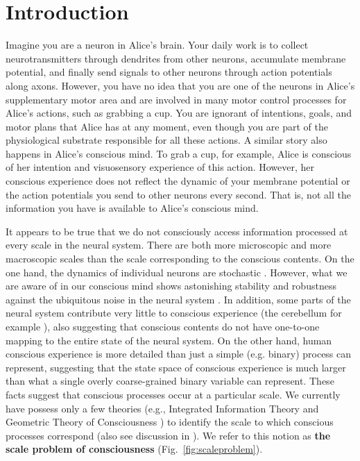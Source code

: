 \documentclass[utf8]{article}
\begin{document}
    \newpage
	\section{Introduction}

		Imagine you are a neuron in Alice’s brain. Your daily work is to collect neurotransmitters through dendrites from other neurons, accumulate membrane potential, and finally send signals to other neurons through action potentials along axons. However, you have no idea that you are one of the neurons in Alice’s supplementary motor area and are involved in many motor control processes for Alice’s actions, such as grabbing a cup. You are ignorant of intentions, goals, and motor plans that Alice has at any moment, even though you are part of the physiological substrate responsible for all these actions. A similar story also happens in Alice’s conscious mind. To grab a cup, for example, Alice is conscious of her intention and visuosensory experience of this action. However, her conscious experience does not reflect the dynamic of your membrane potential or the action potentials you send to other neurons every second. That is, not all the information you have is available to Alice’s conscious mind.

		
		It appears to be true that we do not consciously access information processed at every scale in the neural system. There are both more microscopic and more macroscopic scales than the scale corresponding to the conscious contents. On the one hand, the dynamics of individual neurons are stochastic \citep{Goldwyn2011, White2000}. However, what we are aware of in our conscious mind shows astonishing stability and robustness against the ubiquitous noise in the neural system \citep{mathis1995computational}. In addition, some parts of the neural system contribute very little to conscious experience (the cerebellum for example \citep{lemon2010life}), also suggesting that conscious contents do not have one-to-one mapping to the entire state of the neural system. On the other hand, human conscious experience is more detailed than just a simple (e.g. binary) process can represent, suggesting that the state space of conscious experience is much larger than what a single overly coarse-grained binary variable can represent. These facts suggest that conscious processes occur at a particular scale. We currently have possess only a few theories (e.g., Integrated Information Theory \citep{hoel2016can} and Geometric Theory of Consciousness \citep{fekete2011towards,fekete2012lack}) to identify the scale to which conscious processes correspond (also see discussion in \cite{fekete2016system}). We refer to this notion as \textbf{the scale problem of consciousness} (Fig.~\ref{fig:scaleproblem}).
\end{document}
